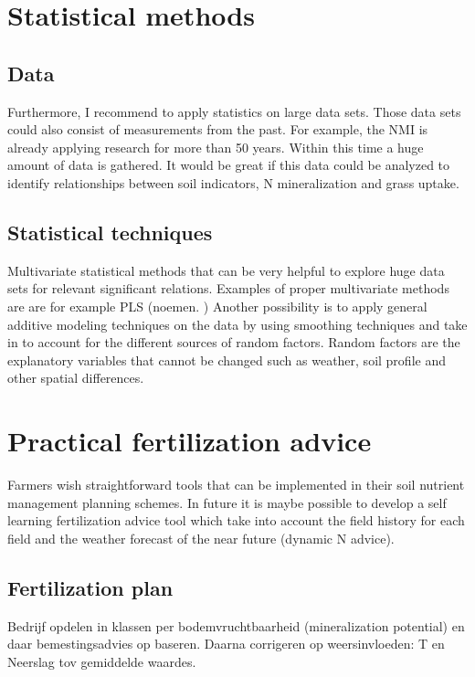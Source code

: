 \documentclass[10pt,twoside,dutch,english]{report}
\begin{document}
	
    
\section{Statistical methods}

	 \subsection{Data}
Furthermore, I recommend to apply statistics on large data sets. Those data sets could also consist of measurements from the past. For example, the NMI is already applying research for more than 50 years. Within this time a huge amount of data is gathered. It would be great if this data could be analyzed to identify relationships between soil indicators, N mineralization and grass uptake. 

	\subsection{Statistical techniques}
	Multivariate statistical methods that can be very helpful to explore huge data sets for relevant significant relations. Examples of proper multivariate methods are  are for example PLS (noemen. ) Another possibility is to apply general additive modeling techniques on the data by using smoothing techniques and take in to account for the different sources of random factors. Random factors are the explanatory variables that cannot be changed such as weather, soil profile and other spatial differences. 



	\section{Practical fertilization advice}
	Farmers wish straightforward tools that can be implemented in their soil nutrient management planning schemes. In future it is maybe possible to develop a self learning fertilization advice tool which take into account the field history for each field and the weather forecast of the near future (dynamic N advice). 
    
    
\subsection{Fertilization plan}
Bedrijf opdelen in klassen per bodemvruchtbaarheid (mineralization potential) en daar bemestingsadvies op baseren. Daarna corrigeren op weersinvloeden: T en Neerslag tov gemiddelde waardes. 
\end{document}
